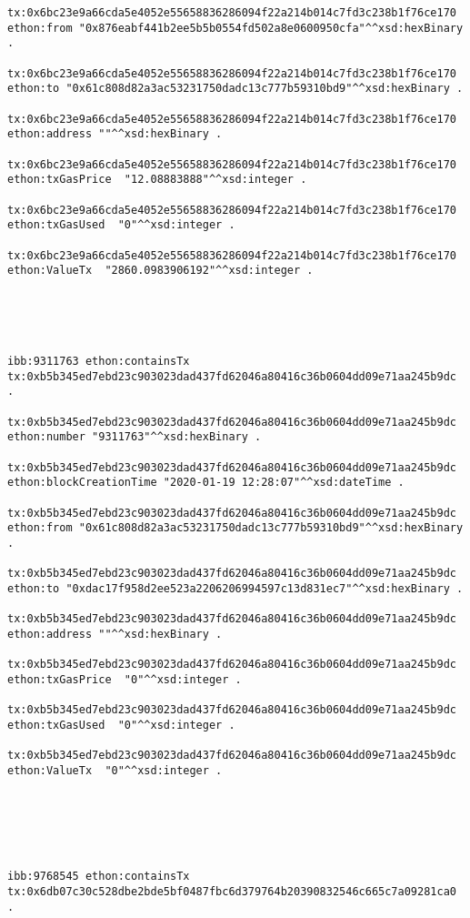 \begin{lstlisting}
tx:0x6bc23e9a66cda5e4052e55658836286094f22a214b014c7fd3c238b1f76ce170  ethon:from "0x876eabf441b2ee5b5b0554fd502a8e0600950cfa"^^xsd:hexBinary .

tx:0x6bc23e9a66cda5e4052e55658836286094f22a214b014c7fd3c238b1f76ce170  ethon:to "0x61c808d82a3ac53231750dadc13c777b59310bd9"^^xsd:hexBinary .

tx:0x6bc23e9a66cda5e4052e55658836286094f22a214b014c7fd3c238b1f76ce170  ethon:address ""^^xsd:hexBinary .

tx:0x6bc23e9a66cda5e4052e55658836286094f22a214b014c7fd3c238b1f76ce170  ethon:txGasPrice  "12.08883888"^^xsd:integer .

tx:0x6bc23e9a66cda5e4052e55658836286094f22a214b014c7fd3c238b1f76ce170  ethon:txGasUsed  "0"^^xsd:integer .

tx:0x6bc23e9a66cda5e4052e55658836286094f22a214b014c7fd3c238b1f76ce170  ethon:ValueTx  "2860.0983906192"^^xsd:integer .





ibb:9311763 ethon:containsTx tx:0xb5b345ed7ebd23c903023dad437fd62046a80416c36b0604dd09e71aa245b9dc .

tx:0xb5b345ed7ebd23c903023dad437fd62046a80416c36b0604dd09e71aa245b9dc  ethon:number "9311763"^^xsd:hexBinary .

tx:0xb5b345ed7ebd23c903023dad437fd62046a80416c36b0604dd09e71aa245b9dc  ethon:blockCreationTime "2020-01-19 12:28:07"^^xsd:dateTime .

tx:0xb5b345ed7ebd23c903023dad437fd62046a80416c36b0604dd09e71aa245b9dc  ethon:from "0x61c808d82a3ac53231750dadc13c777b59310bd9"^^xsd:hexBinary .

tx:0xb5b345ed7ebd23c903023dad437fd62046a80416c36b0604dd09e71aa245b9dc  ethon:to "0xdac17f958d2ee523a2206206994597c13d831ec7"^^xsd:hexBinary .

tx:0xb5b345ed7ebd23c903023dad437fd62046a80416c36b0604dd09e71aa245b9dc  ethon:address ""^^xsd:hexBinary .

tx:0xb5b345ed7ebd23c903023dad437fd62046a80416c36b0604dd09e71aa245b9dc  ethon:txGasPrice  "0"^^xsd:integer .

tx:0xb5b345ed7ebd23c903023dad437fd62046a80416c36b0604dd09e71aa245b9dc  ethon:txGasUsed  "0"^^xsd:integer .

tx:0xb5b345ed7ebd23c903023dad437fd62046a80416c36b0604dd09e71aa245b9dc  ethon:ValueTx  "0"^^xsd:integer .






ibb:9768545 ethon:containsTx tx:0x6db07c30c528dbe2bde5bf0487fbc6d379764b20390832546c665c7a09281ca0 .


\end{lstlisting}
